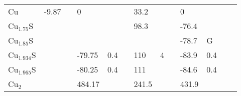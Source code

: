\begin{landscape}
\begin{center}
\begin{longtable}{|l|p{2.5cm}|l|p{2.5cm}|l|l|p{2.5cm}|l|l|p{2.5cm}|l|l|l|}
Cu               	   & -9.87                      & \citep{Barin1977} & 0                   &     & \citep{Haynes2013}     & 33.2               &     & \citep{Haynes2013} & 0                                   &     & \citep{Haynes2013} &  \\
Cu$_{1.75}$S           &                            &     &                     &     &         & 98.3               &     & \citep{Puigdomenech2000} & -76.4                               &     & \citep{Puigdomenech2000} &  \\
Cu$_{1.85}$S           &                            &     &                     &     &         &                    &     &     & -78.7                               & G   & \citep{Hiroi1986} &  \\
Cu$_{1.934}$S          &                            &     & -79.75              & 0.4 & \citep{Potter1977}     & 110                & 4   & \citep{Potter1977} & -83.9                               & 0.4 & \citep{Potter1977} &  \\
Cu$_{1.965}$S          &                            &     & -80.25              & 0.4 & \citep{Potter1977}     & 111                &     & \citep{Potter1977} & -84.6                               & 0.4 & \citep{Potter1977} &  \\
Cu$_2$            	   &                            &     & 484.17              &     & \citep{WagmanDonaldD1969}     & 241.5              &     & \citep{WagmanDonaldD1969} & 431.9                              &     & \citep{WagmanDonaldD1969} &  \\


\end{longtable}
\end{center}
\end{landscape}
